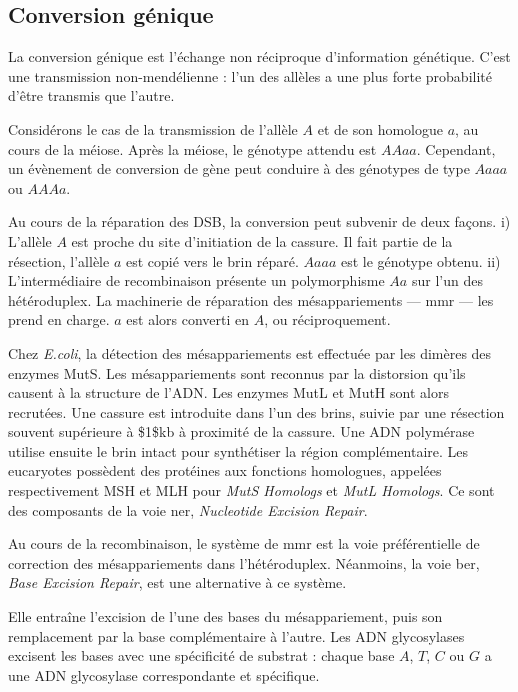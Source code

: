 \documentclass[11pt, oneside]{scrartcl}
\begin{document}

\subsection{Conversion génique}
\label{sec:orgheadline2}
La conversion génique est l'échange non réciproque d'information génétique.
C'est une transmission non-mendélienne : l'un des allèles a une plus forte
probabilité d'être transmis que l'autre\cite{chen_gene_2007}. 

Considérons le cas de la transmission de l'allèle \(A\) et de son homologue \(a\),
au cours de la méiose. Après la méiose, le génotype attendu est \(AAaa\).
Cependant, un évènement de conversion de gène peut conduire à des génotypes de
type \(Aaaa\) ou \(AAAa\). 

Au cours de la réparation des DSB, la conversion peut subvenir de deux façons.
i) L'allèle \(A\) est proche du site d'initiation de la cassure. Il fait partie de
la résection, l'allèle \(a\) est copié vers le brin réparé. \(Aaaa\) est le génotype
obtenu. ii) L'intermédiaire de recombinaison présente un polymorphisme \(Aa\) sur
l'un des hétéroduplex. La machinerie de réparation des mésappariements ---
\ac{mmr} --- les prend en charge. \(a\) est alors converti en \(A\), ou
réciproquement.

Chez \emph{E.coli}, la détection des mésappariements est effectuée par les dimères
des enzymes MutS. Les mésappariements sont reconnus par la distorsion qu'ils
causent à la structure de l'ADN. Les enzymes MutL et MutH sont alors recrutées.
Une cassure est introduite dans l'un des brins, suivie par une résection souvent
supérieure à \$1\$kb à proximité de la cassure. Une ADN polymérase utilise ensuite
le brin intact pour synthétiser la région complémentaire. Les eucaryotes
possèdent des protéines aux fonctions homologues, appelées respectivement MSH et
MLH pour \emph{MutS Homologs} et \emph{MutL Homologs}. Ce sont des composants de la voie
\ac{ner}, \emph{Nucleotide Excision Repair}.

Au cours de la recombinaison, le système de \ac{mmr} est la voie préférentielle
de correction des mésappariements dans l'hétéroduplex. Néanmoins, la voie
\ac{ber}, \emph{Base Excision Repair}, est une alternative à ce système.

Elle entraîne l'excision de l'une des bases du mésappariement, puis son
remplacement par la base complémentaire à l'autre. Les ADN glycosylases excisent
les bases avec une spécificité de substrat : chaque base \(A\), \(T\), \(C\) ou \(G\) a
une ADN glycosylase correspondante et spécifique.
\end{document}
